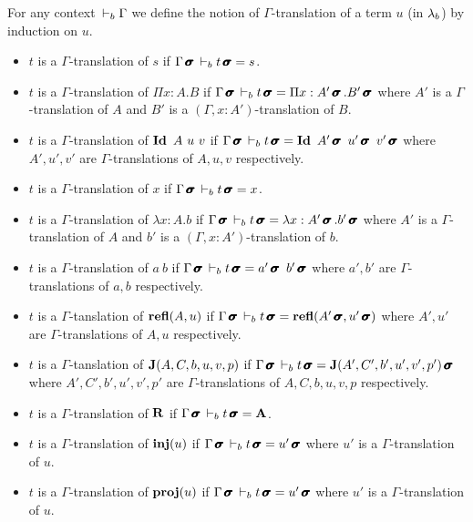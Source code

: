 \documentclass[a4paper,english]{lipics-utf8x}
\begin{document}
  \begin{definition}
    For any context $\,\vdash_b \Gamma$ we define the notion of $\Gamma$-translation
    of a term $u$ (in $\lambda_b$) by induction on $u$.
    \begin{itemize}
      \item $t$ is a $\Gamma$-translation of $s$ if
            $\Gamma \operatorname{\pmb{\bm{\sigma}}} \,\vdash_b t \operatorname{\pmb{\bm{\sigma}}} = s$.
      \item $t$ is a $\Gamma$-translation of $\Pi x:A.B$ if
            $\Gamma \operatorname{\pmb{\bm{\sigma}}} \,\vdash_b t \operatorname{\pmb{\bm{\sigma}}} = \Pi x:A'\operatorname{\pmb{\bm{\sigma}}}.B'\operatorname{\pmb{\bm{\sigma}}}$ where
            $A'$ is a $\Gamma$-translation of $A$ and $B'$ is a
            $(\Gamma, x:A')$-translation of $B$.
      \item $t$ is a $\Gamma$-translation of $\operatorname{\mathbf{Id}~} A\ u\ v$ if
            $\Gamma \msigma \derb t \msigma = \Id A'\msigma\ u'\msigma\ %
            v'\msigma$ where $A',u',v'$
            are $\Gamma$-translations of $A,u,v$ respectively.
      \item $t$ is a $\Gamma$-translation of $x$ if
            $\Gamma \operatorname{\pmb{\bm{\sigma}}} \,\vdash_b t \operatorname{\pmb{\bm{\sigma}}} = x$.
      \item $t$ is a $\Gamma$-translation of $\lambda x:A.b$ if
            $\Gamma \operatorname{\pmb{\bm{\sigma}}} \,\vdash_b t \operatorname{\pmb{\bm{\sigma}}} = \lambda x:A'\operatorname{\pmb{\bm{\sigma}}}.b'\operatorname{\pmb{\bm{\sigma}}}$
            where $A'$ is a $\Gamma$-translation of $A$ and $b'$ is a
            $(\Gamma, x:A')$-translation of $b$.
      \item $t$ is a $\Gamma$-translation of $a\ b$ if
            $\Gamma \operatorname{\pmb{\bm{\sigma}}} \,\vdash_b t \operatorname{\pmb{\bm{\sigma}}} = a'\operatorname{\pmb{\bm{\sigma}}}\ b'\operatorname{\pmb{\bm{\sigma}}}$ where
            $a',b'$ are $\Gamma$-translations of $a,b$ respectively.
      \item $t$ is a $\Gamma$-tanslation of $\operatorname{\mathbf{refl}}(A,u)$ if
            $\Gamma \operatorname{\pmb{\bm{\sigma}}} \,\vdash_b t \operatorname{\pmb{\bm{\sigma}}} = \operatorname{\mathbf{refl}}(A'\operatorname{\pmb{\bm{\sigma}}},u'\operatorname{\pmb{\bm{\sigma}}})$ where
            $A',u'$ are $\Gamma$-translations of $A,u$ respectively.
      \item \sloppy
            $t$ is a $\Gamma$-tanslation of $\operatorname{\mathbf{J}}(A,C,b,u,v,p)$ if
            $\Gamma \operatorname{\pmb{\bm{\sigma}}} \,\vdash_b t \operatorname{\pmb{\bm{\sigma}}} = \operatorname{\mathbf{J}}(A',C',b',u',v',p')\operatorname{\pmb{\bm{\sigma}}}$
            where $A',C',b',u',v',p'$ are $\Gamma$-translations of
            $A,C,b,u,v,p$ respectively.
      \item $t$ is a $\Gamma$-translation of $\operatorname{\mathbf{R}}$ if
            $\Gamma \operatorname{\pmb{\bm{\sigma}}} \,\vdash_b t \operatorname{\pmb{\bm{\sigma}}} = \operatorname{\mathbf{A}}$.
      \item $t$ is a $\Gamma$-translation of $\operatorname{\mathbf{inj}}(u)$ if
            $\Gamma \operatorname{\pmb{\bm{\sigma}}} \,\vdash_b t \operatorname{\pmb{\bm{\sigma}}} = u'\operatorname{\pmb{\bm{\sigma}}}$ where $u'$ is a
            $\Gamma$-translation of $u$.
      \item $t$ is a $\Gamma$-translation of $\operatorname{\mathbf{proj}}(u)$ if
            $\Gamma \operatorname{\pmb{\bm{\sigma}}} \,\vdash_b t \operatorname{\pmb{\bm{\sigma}}} = u'\operatorname{\pmb{\bm{\sigma}}}$ where $u'$ is a
            $\Gamma$-translation of $u$.
    \end{itemize}
  \end{definition}
\end{document}
